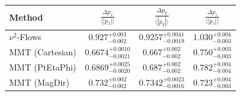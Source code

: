    \begin{tabular}{lccc}
        \toprule
        Method & $\frac{\Delta p_x}{\langle |p_x|\rangle}$ & $\frac{\Delta p_y}{\langle |p_y|\rangle}$ & $\frac{\Delta p_z}{\langle |p_z|\rangle}$ \\
        \midrule
        $\nu^2$-Flows & $0.927^{+0.003}_{-0.002}$ & $0.9257^{+0.0041}_{-0.0019}$ & $1.030^{+0.004}_{-0.003}$ \\
        MMT (Cartesian) & $0.6674^{+0.0010}_{-0.0021}$ & $0.667^{+0.002}_{-0.002}$ & $0.750^{+0.003}_{-0.003}$ \\
        MMT (PtEtaPhi) & $0.6869^{+0.0025}_{-0.0020}$ & $0.687^{+0.002}_{-0.002}$ & $0.782^{+0.004}_{-0.004}$ \\
        MMT (MagDir) & $0.732^{+0.002}_{-0.002}$ & $0.7342^{+0.0023}_{-0.0016}$ & $0.723^{+0.004}_{-0.003}$ \\
        \bottomrule
    \end{tabular}